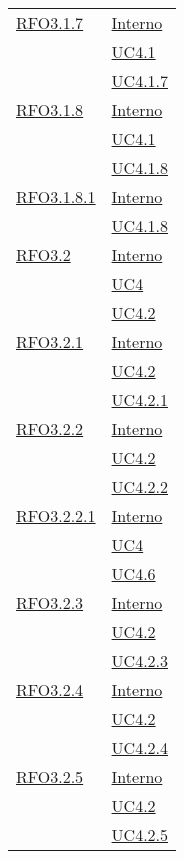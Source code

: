 \begin{longtable}{|>{\centering}m{5cm}|m{5cm}<{\centering}|}
\hyperlink{RFO3.1.7}{RFO3.1.7} & \hyperlink{Interno}{Interno}\\
& \hyperref[UC4.1]{UC4.1}\\
& \hyperref[UC4.1.7]{UC4.1.7}\\ \hline

\hyperlink{RFO3.1.8}{RFO3.1.8} & \hyperlink{Interno}{Interno}\\
& \hyperref[UC4.1]{UC4.1}\\
& \hyperref[UC4.1.8]{UC4.1.8}\\ \hline

\hyperlink{RFO3.1.8.1}{RFO3.1.8.1} & \hyperlink{Interno}{Interno}\\
& \hyperref[UC4.1.8]{UC4.1.8}\\ \hline

\hyperlink{RFO3.2}{RFO3.2} & \hyperlink{Interno}{Interno}\\
& \hyperref[UC4]{UC4}\\
& \hyperref[UC4.2]{UC4.2}\\ \hline

\hyperlink{RFO3.2.1}{RFO3.2.1} & \hyperlink{Interno}{Interno}\\
& \hyperref[UC4.2]{UC4.2}\\
& \hyperref[UC4.2.1]{UC4.2.1}\\ \hline

\hyperlink{RFO3.2.2}{RFO3.2.2} & \hyperlink{Interno}{Interno}\\
& \hyperref[UC4.2]{UC4.2}\\
& \hyperref[UC4.2.2]{UC4.2.2}\\ \hline

\hyperlink{RFO3.2.2.1}{RFO3.2.2.1} & \hyperlink{Interno}{Interno}\\
& \hyperref[UC4]{UC4}\\
& \hyperref[UC4.6]{UC4.6}\\ \hline

\hyperlink{RFO3.2.3}{RFO3.2.3} & \hyperlink{Interno}{Interno}\\
& \hyperref[UC4.2]{UC4.2}\\
& \hyperref[UC4.2.3]{UC4.2.3}\\ \hline

\hyperlink{RFO3.2.4}{RFO3.2.4} & \hyperlink{Interno}{Interno}\\
& \hyperref[UC4.2]{UC4.2}\\
& \hyperref[UC4.2.4]{UC4.2.4}\\ \hline

\hyperlink{RFO3.2.5}{RFO3.2.5} & \hyperlink{Interno}{Interno}\\
& \hyperref[UC4.2]{UC4.2}\\
& \hyperref[UC4.2.5]{UC4.2.5}\\ \hline


\end{longtable}
